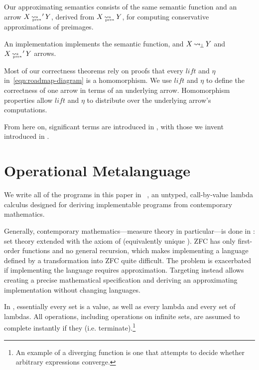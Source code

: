 \documentclass[preprint]{sigplanconf}
\newcommand{\arrow}{\rightsquigarrow}
\newcommand{\arrowlift}{\ensuremath{lift}}
\newcommand{\arrowtrans}{\ensuremath{\eta}}
\DeclareMathOperator{\botto}{\arrow_{\mspace{-3mu}\bot}}
\DeclareMathOperator{\ppreto}{\arrow_{\mspace{-19mu}_{\mathrm{pre*}}}}
\begin{document}
Our approximating semantics consists of the same semantic function and an arrow $X \ppreto' Y$, derived from $X \ppreto Y$, for computing conservative approximations of preimages.

An implementation implements the semantic function, and $X \botto Y$ and $X \ppreto' Y$ arrows.

Most of our correctness theorems rely on proofs that every $\arrowlift$ and $\arrowtrans$ in~\eqref{eqn:roadmap-diagram} is a homomorphism.
We use $\arrowlift$ and $\arrowtrans$ to define the correctness of one arrow in terms of an underlying arrow.
Homomorphism properties allow $\arrowlift$ and $\arrowtrans$ to distribute over the underlying arrow's computations.

From here on, significant terms are introduced in , with those we invent introduced in .


\section{Operational Metalanguage}

We write all of the programs in this paper in \lzfclang~\cite{cit:toronto-2012flops-lzfc}, an untyped, call-by-value lambda calculus designed for deriving implementable programs from contemporary mathematics.

Generally, contemporary mathematics---measure theory in particular---is done in :  set theory extended with the axiom of  (equivalently unique ).
ZFC has only first-order functions and no general recursion, which makes implementing a language defined by a transformation into ZFC quite difficult.
The problem is exacerbated if implementing the language requires approximation.
Targeting \lzfclang instead allows creating a precise mathematical specification and deriving an approximating implementation without changing languages.

In \lzfclang, essentially every set is a value, as well as every lambda and every set of lambdas.
All operations, including operations on infinite sets, are assumed to complete instantly if they  (i.e. terminate).\footnote{An example of a diverging \lzfclang function is one that attempts to decide whether arbitrary \lzfclang expressions converge.}
\end{document}
